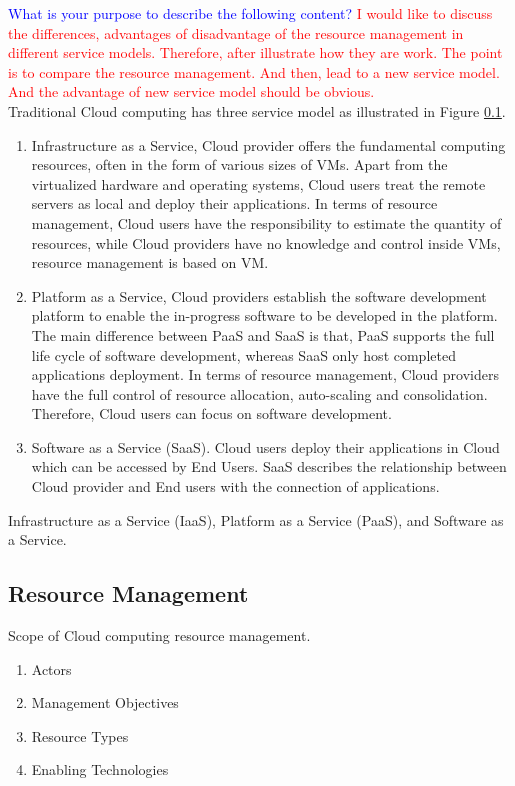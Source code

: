 \textcolor{Blue}{What is your purpose to describe the following content?}
\textcolor{Red}{
	I would like to discuss the differences, advantages of disadvantage of the resource management in different service models. Therefore, after illustrate how they are work. The point is to compare the resource management. And then, lead to a new service model. And the advantage of new service model should be obvious. 
}\\
Traditional Cloud computing has three service model as illustrated in Figure \ref{}.
\begin{enumerate}
 \item Infrastructure as a Service, Cloud provider offers the fundamental computing resources, often in the form of various sizes of VMs. Apart from the virtualized hardware and operating systems, Cloud users treat the remote servers as local and deploy their applications. In terms of resource management, Cloud users have the responsibility to estimate the quantity of resources, while Cloud providers have no knowledge and control inside VMs, resource management is based on VM. 
  \item Platform as a Service, Cloud providers establish the software development platform to enable the in-progress software to be developed in the platform.  The main difference between PaaS and SaaS is that, PaaS supports the full life cycle of software development, whereas SaaS only host completed applications deployment. In terms of resource management, Cloud providers have the full control of resource allocation, auto-scaling and consolidation. Therefore, Cloud users can focus on software development.
  \item Software as a Service (SaaS). Cloud users deploy their applications in Cloud which can be accessed by End Users. SaaS describes the relationship between Cloud provider and End users with the connection of applications.

\end{enumerate}
Infrastructure as a Service (IaaS), Platform as a Service (PaaS), and Software as a Service. 
\subsection{Resource Management}
Scope of Cloud computing resource management.
\begin{enumerate}
 \item Actors
 \item Management Objectives
 \item Resource Types
 \item Enabling Technologies
\end{enumerate}



